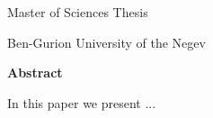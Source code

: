 \thispagestyle{plain}

\begin{center}
    \Large
    \thesistitle

    \vspace{0.4cm}
    \large
    \thesisauthorname
       
    \vspace{0.4cm}
    \large
    Master of Sciences Thesis 
      
    \vspace{0.2cm}
    \large
    Ben-Gurion University of the Negev 
    
    \vspace{0.2cm}
    \large
    \thesisyear
    
    \vspace{0.9cm}
    \Large
    \textbf{Abstract}
\end{center}

In this paper we present ...



